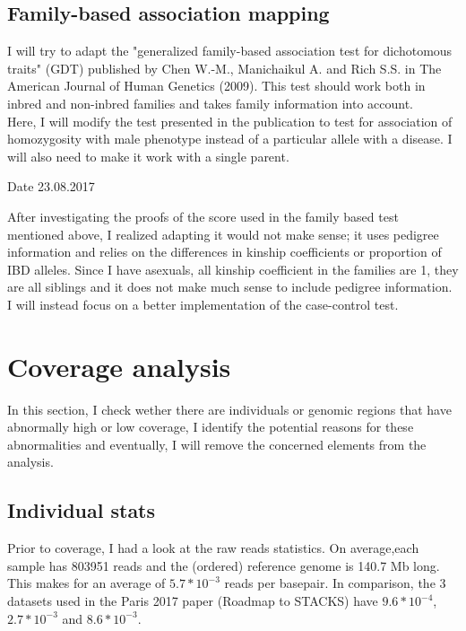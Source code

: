 \documentclass[10pt,a4paper]{report}
\begin{document}
\section{Family-based association mapping}

I will try to adapt the "generalized family-based association test for dichotomous traits" (GDT) published by Chen W.-M., Manichaikul A. and Rich S.S. in The American Journal of Human Genetics (2009). This test should work both in inbred and non-inbred families and takes family information into account.\\

Here, I will modify the test presented in the publication to test for association of homozygosity with male phenotype instead of a particular allele with a disease. I will also need to make it work with a single parent.

Date 23.08.2017

After investigating the proofs of the score used in the family based test mentioned above, I realized adapting it would not make sense; it uses pedigree information and relies on the differences in kinship coefficients or proportion of IBD alleles. Since I have asexuals, all kinship coefficient in the families are 1, they are all siblings and it does not make much sense to include pedigree information. 
I will instead focus on a better implementation of the case-control test.

\chapter{Coverage analysis}

In this section, I check wether there are individuals or genomic regions that have abnormally high or low coverage, I identify the potential reasons for these abnormalities and eventually, I will remove the concerned elements from the analysis.

\section{Individual stats}

Prior to coverage, I had a look at the raw reads statistics. On average,each sample has 803951 reads and the (ordered) reference genome is 140.7 Mb long. This makes for an average of $5.7*10^{-3}$ reads per basepair.
In comparison, the 3 datasets used in the Paris 2017 paper (Roadmap to STACKS) have $9.6*10^{-4}$, $2.7*10^{-3}$ and $8.6*10^{-3}$.
\end{document}
